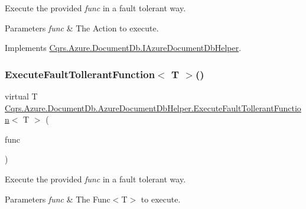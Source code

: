 Execute the provided {\itshape func}  in a fault tolerant way. 


\begin{DoxyParams}{Parameters}
{\em func} & The Action to execute.\\
\hline
\end{DoxyParams}


Implements \hyperlink{interfaceCqrs_1_1Azure_1_1DocumentDb_1_1IAzureDocumentDbHelper_af0a2c96f00154420faa7c528d5bf55bb_af0a2c96f00154420faa7c528d5bf55bb}{Cqrs.\+Azure.\+Document\+Db.\+I\+Azure\+Document\+Db\+Helper}.

\mbox{\label{classCqrs_1_1Azure_1_1DocumentDb_1_1AzureDocumentDbHelper_a470fcc86befa4a28725ad53e715a223c_a470fcc86befa4a28725ad53e715a223c}} 
\subsubsection{\texorpdfstring{Execute\+Fault\+Tollerant\+Function$<$ T $>$()}{ExecuteFaultTollerantFunction< T >()}}
{\footnotesize\ttfamily virtual T \hyperlink{classCqrs_1_1Azure_1_1DocumentDb_1_1AzureDocumentDbHelper_a334337444ff416c9f4ce48ec61e60a83_a334337444ff416c9f4ce48ec61e60a83}{Cqrs.\+Azure.\+Document\+Db.\+Azure\+Document\+Db\+Helper.\+Execute\+Fault\+Tollerant\+Function}$<$ T $>$ (\begin{DoxyParamCaption}\item[{Func$<$ T $>$}]{func }\end{DoxyParamCaption})\hspace{0.3cm}{\ttfamily [virtual]}}



Execute the provided {\itshape func}  in a fault tolerant way. 


\begin{DoxyParams}{Parameters}
{\em func} & The Func$<$\+T$>$ to execute.\\
\hline
\end{DoxyParams}


